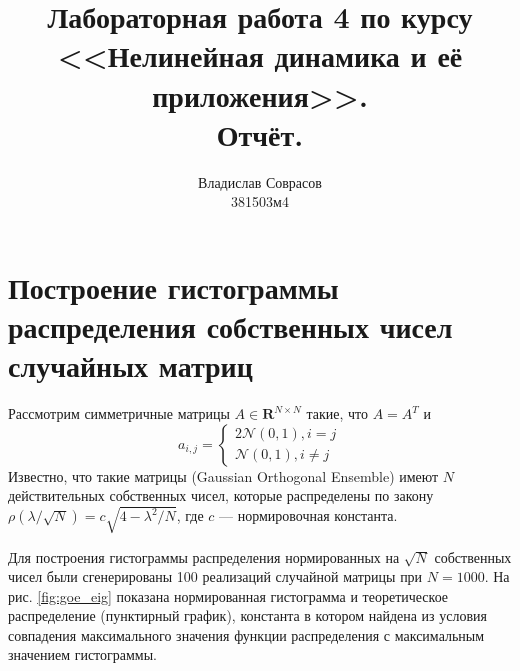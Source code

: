 \documentclass[a4paper]{article}
\begin{document}
\title{Лабораторная работа 4 по курсу <<Нелинейная динамика и её приложения>>. \\Отчёт.}
\author{Владислав Соврасов\\ 381503м4}
\date{}
\maketitle

\section{Построение гистограммы распределения собственных чисел случайных матриц}
Рассмотрим симметричные матрицы \(A\in \mathbf{R}^{N\times N}\) такие, что \(A=A^T\) и
\begin{displaymath}
	a_{i,j} = \left\{
  \begin{array}{lr}
    2\mathcal{N}(0,1), i=j\\
		\mathcal{N}(0,1), i	\neq j
  \end{array}
\right.
\end{displaymath}
Известно, что такие матрицы (Gaussian Orthogonal Ensemble) имеют \(N\) действительных собственных чисел, которые
распределены по закону \(\rho(\lambda / \sqrt{N})=c \sqrt{4-\lambda^2/N}\), где
\(c\) --- нормировочная константа.

Для построения гистограммы распределения нормированных на \(\sqrt{N}\) собственных чисел были
сгенерированы 100 реализаций случайной матрицы при \(N=1000\). На рис. \ref{fig:goe_eig}
показана нормированная гистограмма и теоретическое распределение (пунктирный график), константа
в котором найдена из условия совпадения максимального значения функции распределения
с максимальным значением гистограммы.
\end{document}
